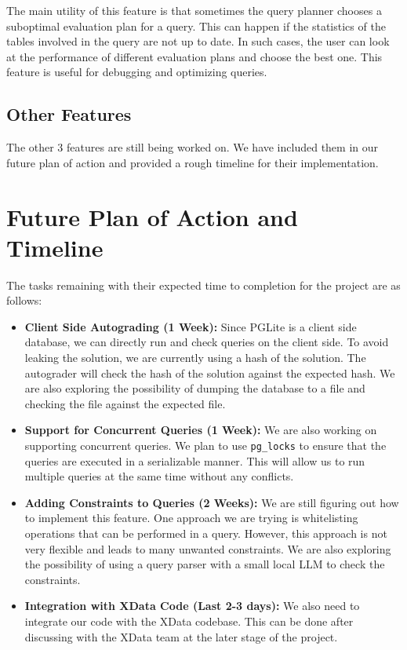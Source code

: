 \documentclass{article}
\begin{document}
The main utility of this feature is that sometimes the query planner chooses a suboptimal evaluation plan for a query. This can happen if the statistics of the tables involved in the query are not up to date. In such cases, the user can look at the performance of different evaluation plans and choose the best one. This feature is useful for debugging and optimizing queries.


\subsection{Other Features}

The other 3 features are still being worked on. We have included them in our future plan of action and provided a rough timeline for their implementation.

\section{Future Plan of Action and Timeline}

The tasks remaining with their expected time to completion for the project are as follows:
\begin{itemize}
    \item \textbf{Client Side Autograding (1 Week):} Since PGLite is a client side database, we can directly run and check queries on the client side. To avoid leaking the solution, we are currently using a hash of the solution. The autograder will check the hash of the solution against the expected hash. We are also exploring the possibility of dumping the database to a file and checking the file against the expected file.
    \item \textbf{Support for Concurrent Queries (1 Week):} We are also working on supporting concurrent queries. We plan to use \verb|pg_locks| to ensure that the queries are executed in a serializable manner. This will allow us to run multiple queries at the same time without any conflicts.
    \item \textbf{Adding Constraints to Queries (2 Weeks):} We are still figuring out how to implement this feature. One approach we are trying is whitelisting operations that can be performed in a query. However, this approach is not very flexible and leads to many unwanted constraints. We are also exploring the possibility of using a query parser with a small local LLM to check the constraints.
    \item \textbf{Integration with XData Code (Last 2-3 days):} We also need to integrate our code with the XData codebase. This can be done after discussing with the XData team at the later stage of the project.
\end{itemize}
\end{document}
